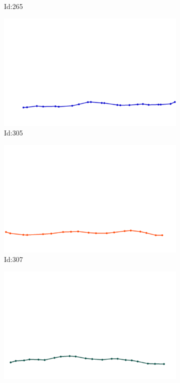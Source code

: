 \documentclass[12pt,twoside]{report}
\begin{document}
\begin{figure}
\begin{subfigure}[b]{0.20\textwidth}
\caption{Id:265}
\end{subfigure}
\begin{subfigure}[b]{0.20\textwidth}
\centering
\includegraphics[width=\textwidth]{../trajectories/305.png}
\caption{Id:305}
\end{subfigure}
\begin{subfigure}[b]{0.20\textwidth}
\centering
\includegraphics[width=\textwidth]{../trajectories/307.png}
\caption{Id:307}
\end{subfigure}
\begin{subfigure}[b]{0.20\textwidth}
\centering
\includegraphics[width=\textwidth]{../trajectories/374.png}

\end{subfigure}
\end{figure}
\end{document}
